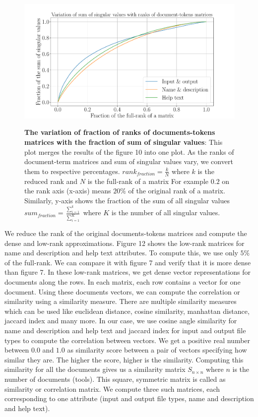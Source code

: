 \begin{figure}[h]
\begin{centering}
    {\includegraphics[scale=0.4]{figures/Fraction_ranks_singular_values.pdf}}
    \caption[The variation of fraction of ranks of documents-tokens matrices with the fraction of sum of singular values]{\textbf{The variation of fraction of ranks of documents-tokens matrices with the fraction of sum of singular values}: This plot merges the results of the figure 10 into one plot. As the ranks of document-term matrices and sum of singular values vary, we convert them to respective percentages. $rank_{fraction} = \frac{k}{N}$ where $k$ is the reduced rank and $N$ is the full-rank of a matrix For example $0.2$ on the rank axis (x-axis) means $20\%$ of the original rank of a matrix. Similarly, y-axis shows the fraction of the sum of all singular values $ sum_{fraction} = \frac{\sum_{i=1}^k}{\sum_{i=1}^K}$ where $K$ is the number of all singular values.}
\end{centering}
\end{figure}

We reduce the rank of the original documents-tokens matrices and compute the dense and low-rank approximations. Figure 12 shows the low-rank matrices for name and description and help text attributes. To compute this, we use only $5\%$ of the full-rank. We can compare it with figure 7 and verify that it is more dense than figure 7. In these low-rank matrices, we get dense vector representations for documents along the rows. In each matrix, each row contains a vector for one document. Using these documents vectors, we can compute the correlation or similarity using a similarity measure. There are multiple similarity measures which can be used like euclidean distance, cosine similarity, manhattan distance, jaccard index and many more. In our case, we use cosine angle similarity for name and description and help text and jaccard index for input and output file types to compute the correlation between vectors. We get a positive real number between $0.0$ and $1.0$ as similarity score between a pair of vectors specifying how similar they are. The higher the score, higher is the similarity. Computing this similarity for all the documents gives us a similarity matrix $S_{n \times n}$ where $n$ is the number of documents (tools). This square, symmetric matrix is called as similarity or correlation matrix. We compute three such matrices, each corresponding to one attribute (input and output file types, name and description and help text).
  
